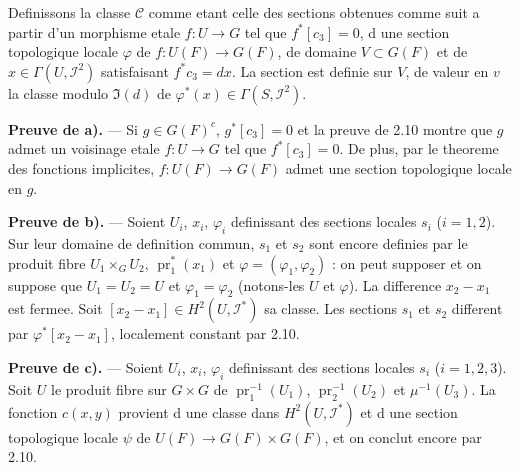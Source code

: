 \documentclass[11pt,a4paper]{article}
\theoremstyle{plain}
\theoremstyle{definition}
\DeclareMathOperator{\pr}{pr}
\begin{document}
Definissons la classe $\mathscr{C}$ comme etant celle des sections obtenues comme suit a partir d'un morphisme etale $f : U \to G$ tel que $f^*[c_3] = 0$, d une section topologique locale $\varphi$ de $f : U(F) \to G(F)$, de domaine $V \subset G(F)$ et de $x \in \Gamma(U, \mathscr{I}^2)$ satisfaisant $f^* c_3 = dx$. La section est definie sur $V$, de valeur en $v$ la classe modulo $\Im(d)$ de $\varphi^*(x) \in \Gamma(S, \mathscr{I}^2)$.

\textbf{Preuve de a).} --- Si $g \in G(F)^c$, $g^*[c_3] = 0$ et la preuve de 2.10 montre que $g$ admet un voisinage etale $f : U \to G$ tel que $f^*[c_3] = 0$. De plus, par le theoreme des fonctions implicites, $f : U(F) \to G(F)$ admet une section topologique locale en $g$.

\textbf{Preuve de b).} --- Soient $U_i$, $x_i$, $\varphi_i$ definissant des sections locales $s_i$ ($i = 1, 2$). Sur leur domaine de definition commun, $s_1$ et $s_2$ sont encore definies par le produit fibre $U_1 \times_G U_2$, $\pr_1^*(x_1)$ et $\varphi = (\varphi_1, \varphi_2)$ : on peut supposer et on suppose que $U_1 = U_2 = U$ et $\varphi_1 = \varphi_2$ (notons-les $U$ et $\varphi$). La difference $x_2 - x_1$ est fermee. Soit $[x_2 - x_1] \in H^2(U, \mathscr{I}^*)$ sa classe. Les sections $s_1$ et $s_2$ different par $\varphi^*[x_2 - x_1]$, localement constant par 2.10.

\textbf{Preuve de c).} --- Soient $U_i$, $x_i$, $\varphi_i$ definissant des sections locales $s_i$ ($i = 1, 2, 3$). Soit $U$ le produit fibre sur $G \times G$ de $\pr_1^{-1}(U_1)$, $\pr_2^{-1}(U_2)$ et $\mu^{-1}(U_3)$. La fonction $c(x,y)$ provient d une classe dans $H^2(U, \mathscr{I}^*)$ et d une section topologique locale $\psi$ de $U(F) \to G(F) \times G(F)$, et on conclut encore par 2.10.

\subsection{}\label{2.11}
\end{document}
